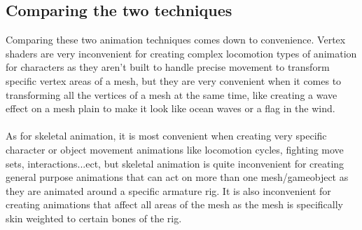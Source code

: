 \documentclass{scrartcl}
\begin{document}
\subsection{Comparing the two techniques}
Comparing these two animation techniques comes down to convenience. Vertex shaders are very inconvenient for creating complex locomotion types of animation for characters as they aren't built to handle precise movement to transform specific vertex areas of a mesh, but they are very convenient when it comes to transforming all the vertices of a mesh at the same time, like creating a wave effect on a mesh plain to make it look like ocean waves or a flag in the wind.
\\~\\
As for skeletal animation, it is most convenient when creating very specific character or object movement animations like locomotion cycles, fighting move sets, interactions...ect, but skeletal animation is quite inconvenient for creating general purpose animations that can act on more than one mesh/gameobject as they are animated around a specific armature rig. It is also inconvenient for creating animations that affect all areas of the mesh as the mesh is specifically skin weighted to certain bones of the rig.

\end{document}
